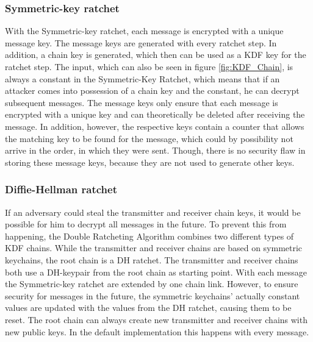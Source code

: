 \documentclass[12pt,oneside,a4paper,parskip]{scrbook}
\begin{document}
\subsubsection{Symmetric-key ratchet}

With the Symmetric-key ratchet, each message is encrypted with a unique message key. The message keys are generated with every ratchet step. In addition, a chain key is generated, which then can be used as a KDF key for the ratchet step. The input, which can also be seen in figure \ref{fig:KDF_Chain}, is always a constant in the Symmetric-Key Ratchet, which means that if an attacker comes into possession of a chain key and the constant, he can decrypt subsequent messages. The message keys only ensure that each message is encrypted with a unique key and can theoretically be deleted after receiving the message. In addition, however, the respective keys contain a counter that allows the matching key to be found for the message, which could by possibility not arrive in the order, in which they were sent. Though, there is no security flaw in storing these message keys, because they are not used to generate other keys.
\parencite{perrin_double_2016}

\subsubsection{Diffie-Hellman ratchet}

If an adversary could steal the transmitter and receiver chain keys, it would be possible for him to decrypt all messages in the future. To prevent this from happening, the Double Ratcheting Algorithm combines two different types of KDF chains. While the transmitter and receiver chains are based on symmetric keychains, the root chain is a DH ratchet. The transmitter and receiver chains both use a DH-keypair from the root chain as starting point. With each message the Symmetric-key ratchet are extended by one chain link. However, to ensure security for messages in the future, the symmetric keychains' actually constant values are updated with the values from the DH ratchet, causing them to be reset. The root chain can always create new transmitter and receiver chains with new public keys. In the default implementation this happens with every message.
\parencite{perrin_double_2016}

\end{document}
